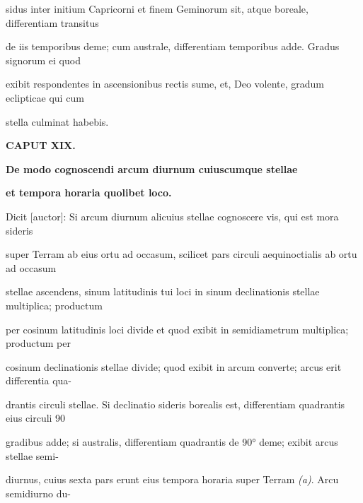 \documentclass[11pt]{article}
\begin{document}
\noindent\hypertarget{AB01-PDF0121-body-L021}{}sidus inter initium Capricorni et finem Geminorum sit, atque boreale, differentiam transitus\strut\par
\noindent\hypertarget{AB01-PDF0121-body-L022}{}de iis temporibus deme; cum australe, differentiam temporibus adde. Gradus signorum ei quod\strut\par
\noindent\hypertarget{AB01-PDF0121-body-L023}{}exibit respondentes in ascensionibus rectis sume, et, Deo volente, gradum eclipticae qui cum\strut\par
\noindent\hypertarget{AB01-PDF0121-body-L024}{}stella culminat habebis.\strut\par
\hypertarget{AB01-PDF0121-body-L025}{}\begin{center}\bfseries CAPUT XIX.\end{center}
\hypertarget{AB01-PDF0121-body-L026}{}\begin{center}\bfseries De modo cognoscendi arcum diurnum cuiuscumque stellae\end{center}
\hypertarget{AB01-PDF0121-body-L027}{}\begin{center}\bfseries et tempora horaria quolibet loco.\end{center}
\noindent\hypertarget{AB01-PDF0121-body-L028}{}Dicit [auctor]: Si arcum diurnum alicuius stellae cognoscere vis, qui est mora sideris\strut\par
\noindent\hypertarget{AB01-PDF0121-body-L029}{}super Terram ab eius ortu ad occasum, scilicet pars circuli aequinoctialis ab ortu ad occasum\strut\par
\noindent\hypertarget{AB01-PDF0121-body-L030}{}stellae ascendens, sinum latitudinis tui loci in sinum declinationis stellae multiplica; productum\strut\par
\noindent\hypertarget{AB01-PDF0121-body-L031}{}per cosinum latitudinis loci divide et quod exibit in semidiametrum multiplica; productum per\strut\par
\noindent\hypertarget{AB01-PDF0121-body-L032}{}cosinum declinationis stellae divide; quod exibit in arcum converte; arcus erit differentia qua-\strut\par
\noindent\hypertarget{AB01-PDF0121-body-L033}{}drantis circuli stellae. Si declinatio sideris borealis est, differentiam quadrantis eius circuli 90\strut\par
\noindent\hypertarget{AB01-PDF0121-body-L034}{}gradibus adde; si australis, differentiam quadrantis de 90° deme; exibit arcus stellae semi-\strut\par
\noindent\hypertarget{AB01-PDF0121-body-L035}{}diurnus, cuius sexta pars erunt eius tempora horaria super Terram \textit{(a)}. Arcu semidiurno du-\strut\par
\end{document}
